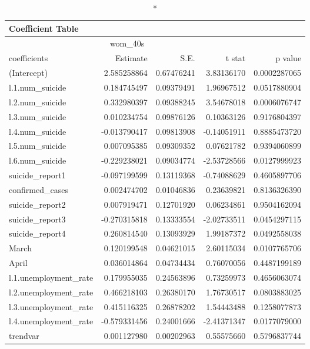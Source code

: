 \begin{longtable}{lrrrr}
\caption*{
{\large Coefficient Table}
} \\ 
\toprule
\multicolumn{4}{c}{wom\_40s} &  \\ 
\cmidrule(lr){1-4}
coefficients & Estimate & S.E. & t stat & p value \\ 
\midrule\addlinespace[2.5pt]
(Intercept) & 2.585258864 & 0.67476241 & 3.83136170 & 0.0002287065 \\ 
l.1.num\_suicide & 0.184745497 & 0.09379491 & 1.96967512 & 0.0517880904 \\ 
l.2.num\_suicide & 0.332980397 & 0.09388245 & 3.54678018 & 0.0006076747 \\ 
l.3.num\_suicide & 0.010234754 & 0.09876126 & 0.10363126 & 0.9176804397 \\ 
l.4.num\_suicide & -0.013790417 & 0.09813908 & -0.14051911 & 0.8885473720 \\ 
l.5.num\_suicide & 0.007095385 & 0.09309352 & 0.07621782 & 0.9394060899 \\ 
l.6.num\_suicide & -0.229238021 & 0.09034774 & -2.53728566 & 0.0127999923 \\ 
suicide\_report1 & -0.097199599 & 0.13119368 & -0.74088629 & 0.4605897706 \\ 
confirmed\_cases & 0.002474702 & 0.01046836 & 0.23639821 & 0.8136326390 \\ 
suicide\_report2 & 0.007919471 & 0.12701920 & 0.06234861 & 0.9504162094 \\ 
suicide\_report3 & -0.270315818 & 0.13333554 & -2.02733511 & 0.0454297115 \\ 
suicide\_report4 & 0.260814540 & 0.13093929 & 1.99187372 & 0.0492558038 \\ 
March & 0.120199548 & 0.04621015 & 2.60115034 & 0.0107765706 \\ 
April & 0.036014864 & 0.04734434 & 0.76070056 & 0.4487199189 \\ 
l.1.unemployment\_rate & 0.179955035 & 0.24563896 & 0.73259973 & 0.4656063074 \\ 
l.2.unemployment\_rate & 0.466218103 & 0.26380170 & 1.76730517 & 0.0803883025 \\ 
l.3.unemployment\_rate & 0.415116325 & 0.26878202 & 1.54443488 & 0.1258077873 \\ 
l.4.unemployment\_rate & -0.579331456 & 0.24001666 & -2.41371347 & 0.0177079000 \\ 
trendvar & 0.001127980 & 0.00202963 & 0.55575660 & 0.5796837744 \\ 
\bottomrule
\end{longtable}

